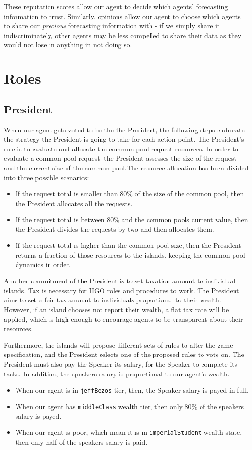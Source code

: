 These reputation scores allow our agent to decide which agents' forecasting information to trust. Similarly, opinions allow our agent to choose which agents to share our \textit{precious} forecasting information with - if we simply share it indiscriminately, other agents may be less compelled to share their data as they would not lose in anything in not doing so. 

\section{Roles}
\subsection{President}
When our agent gets voted to be the the President, the following steps elaborate the strategy the President is going to take for each action point.
The President's role is to evaluate and allocate the common pool request resources. In order to evaluate a common pool request, the President assesses the size of the request and the current size of the common pool.The resource allocation has been divided into three possible scenarios: 
    \begin{itemize}
        \item If the request total is smaller than $80\%$ of the size of the common pool, then the President allocates all the requests.
        \item If the request total is between $80\%$ and the common pools current value, then the President divides the requests by two and then allocates them.
        \item If the request total is higher than the common pool size, then the President returns a fraction of those resources to the islands, keeping the common pool dynamics in order.
    \end{itemize}

Another commitment of the President is to set taxation amount to individual islands. Tax is necessary for IIGO roles and procedures to work. The President aims to set a fair tax amount to individuals proportional to their wealth. However, if an island chooses not report their wealth, a flat tax rate will be applied, which is high enough to encourage agents to be transparent about their resources. 

Furthermore, the islands will propose different sets of rules to alter the game specification, and the President selects one of the proposed rules to vote on.    
The President must also pay the Speaker its salary, for the Speaker to complete its tasks. In addition, the speakers salary is proportional to our agent's wealth. 
    \begin{itemize}
        \item When our agent is in \texttt{jeffBezos} tier, then, the Speaker salary is payed in full.
        \item When our agent has \texttt{middleClass} wealth tier, then only $80\%$ of the speakers salary is payed.
        \item When our agent is poor, which mean it is in \texttt{imperialStudent} wealth state, then only half of the speakers salary is paid.
    \end{itemize}

